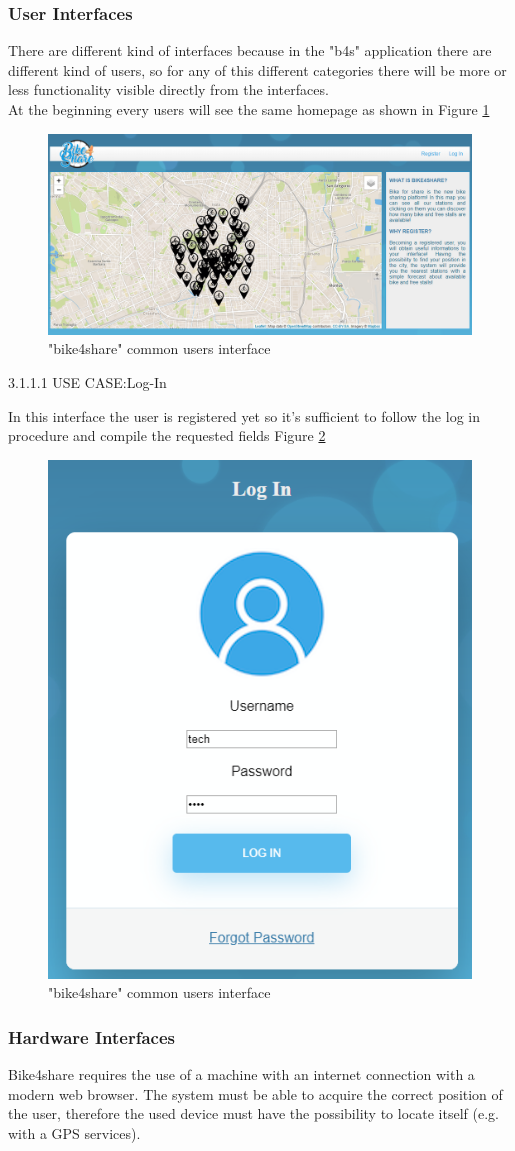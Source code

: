 \documentclass{article}
\begin{document}
\subsubsection{User Interfaces}
There are different kind of interfaces because in the "b4s" application there are different kind of users, so for any of this different categories there will be more or less functionality visible directly from the interfaces.\\
At the beginning every users will see the same homepage as shown in Figure \ref{fig:homepage}\\
\begin{figure}[H]
    \centering
    \includegraphics[width=0.75\linewidth]{image/all.PNG}
    \caption{"bike4share" common users interface}
    \label{fig:homepage}
\end{figure}

3.1.1.1 USE CASE:Log-In

In this interface the user is registered yet so it's sufficient to follow the log in procedure and compile the requested fields Figure \ref{fig:log-in 2}
\begin{figure}[h]
    \centering
    \includegraphics[width=0.35\linewidth]{image/log_in.PNG}
    \caption{"bike4share" common users interface}
    \label{fig:log-in 2}
\end{figure}

\subsubsection{Hardware Interfaces}
Bike4share requires the use of a machine with an internet connection with a modern web browser.
The system must be able to acquire the correct position of the user, therefore the used device must have the possibility to locate itself (e.g. with a GPS services).
\end{document}
